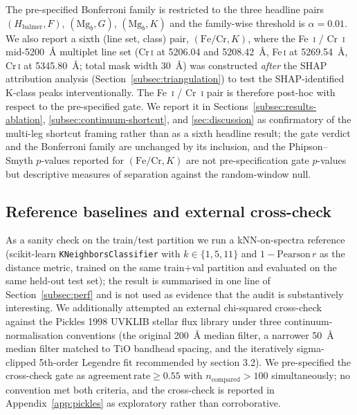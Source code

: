 \documentclass[11pt,a4paper]{article}
\newcommand{\FeI}{Fe\,\textsc{i}\xspace}
\newcommand{\CrI}{Cr\,\textsc{i}\xspace}
\begin{document}
The pre-specified Bonferroni family is restricted to the three headline pairs $(H_{\mathrm{balmer}}, F)$, $(\mathrm{Mg}_b, G)$, $(\mathrm{Mg}_b, K)$ and the family-wise threshold is $\alpha = 0.01$. We also report a sixth (line set, class) pair, $(\mathrm{Fe}/\mathrm{Cr}, K)$, where the Fe~\textsc{i} / Cr~\textsc{i} mid-5200~\AA{} multiplet line set (\CrI at 5206.04 and 5208.42~\AA, \FeI at 5269.54~\AA, \CrI at 5345.80~\AA; total mask width 30~\AA) was constructed \emph{after} the SHAP attribution analysis (Section~\ref{subsec:triangulation}) to test the SHAP-identified K-class peaks interventionally. The Fe~\textsc{i} / Cr~\textsc{i} pair is therefore post-hoc with respect to the pre-specified gate. We report it in Sections~\ref{subsec:results-ablation}, \ref{subsec:continuum-shortcut}, and \ref{sec:discussion} as confirmatory of the multi-leg shortcut framing rather than as a sixth headline result; the gate verdict and the Bonferroni family are unchanged by its inclusion, and the Phipson--Smyth $p$-values reported for $(\mathrm{Fe}/\mathrm{Cr}, K)$ are not pre-specification gate $p$-values but descriptive measures of separation against the random-window null.

\subsection{Reference baselines and external cross-check}
\label{subsec:baselines}

As a sanity check on the train/test partition we run a kNN-on-spectra reference (scikit-learn \texttt{KNeighborsClassifier} with $k \in \{1, 5, 11\}$ and $1 - \mathrm{Pearson}\,r$ as the distance metric, trained on the same train$+$val partition and evaluated on the same held-out test set); the result is summarised in one line of Section~\ref{subsec:perf} and is not used as evidence that the audit is substantively interesting. We additionally attempted an external chi-squared cross-check against the Pickles 1998 UVKLIB stellar flux library \citep{1998PASP..110..863P} under three continuum-normalisation conventions (the original 200~\AA{} median filter, a narrower 50~\AA{} median filter matched to TiO bandhead spacing, and the iteratively sigma-clipped 5th-order Legendre fit recommended by \citet{1998PASP..110..863P} section 3.2). We pre-specified the cross-check gate as $\mathrm{agreement\,rate} \geq 0.55$ with $n_{\mathrm{compared}} > 100$ simultaneously; no convention met both criteria, and the cross-check is reported in Appendix~\ref{app:pickles} as exploratory rather than corroborative.
\end{document}
